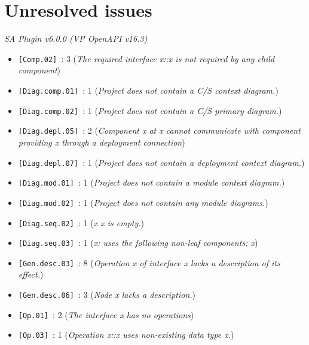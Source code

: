 \section{Unresolved issues}\label{sec:checks}
\emph{SA Plugin v6.0.0 (VP OpenAPI v16.3)}
\begin{itemize}[nolistsep,noitemsep]
\item \texttt{[Comp.02] }: 3 (\emph{The required interface x::x is not required by any child component})

\item \texttt{[Diag.comp.01] }: 1 (\emph{Project does not contain a C/S context diagram.})

\item \texttt{[Diag.comp.02] }: 1 (\emph{Project does not contain a C/S primary diagram.})

\item \texttt{[Diag.depl.05] }: 2 (\emph{Component x at x cannot communicate with component providing x through a deployment connection})

\item \texttt{[Diag.depl.07] }: 1 (\emph{Project does not contain a deployment context diagram.})

\item \texttt{[Diag.mod.01] }: 1 (\emph{Project does not contain a module context diagram.})

\item \texttt{[Diag.mod.02] }: 1 (\emph{Project does not contain any module diagrams.})

\item \texttt{[Diag.seq.02] }: 1 (\emph{x x is empty.})

\item \texttt{[Diag.seq.03] }: 1 (\emph{x: uses the following non-leaf components: x})

\item \texttt{[Gen.desc.03] }: 8 (\emph{Operation x of interface x lacks a description of its effect.})

\item \texttt{[Gen.desc.06] }: 3 (\emph{Node x lacks a description.})

\item \texttt{[Op.01] }: 2 (\emph{The interface x has no operations})

\item \texttt{[Op.03] }: 1 (\emph{Operation x::x uses non-existing data type x.})

\end{itemize}

%
